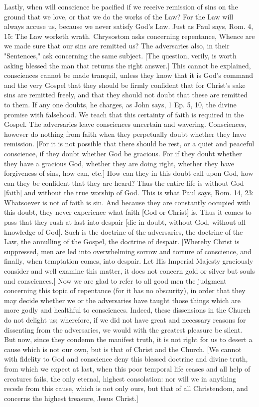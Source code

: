 Lastly, when will conscience be pacified if we receive remission of
sins on the ground that we love, or that we do the works of the Law?
For the Law will always accuse us, because we never satisfy God's Law.
Just as Paul says, Rom. 4, 15: The Law worketh wrath.  Chrysostom
asks concerning repentance, Whence are we made sure that our sins are
remitted us?  The adversaries also, in their "Sentences," ask
concerning the same subject.  [The question, verily, is worth asking
blessed the man that returns the right answer.] This cannot be
explained, consciences cannot be made tranquil, unless they know that
it is God's command and the very Gospel that they should be firmly
confident that for Christ's sake sins are remitted freely, and that
they should not doubt that these are remitted to them.  If any one
doubts, he charges, as John says, 1 Ep. 5, 10, the divine promise
with falsehood.  We teach that this certainty of faith is required in
the Gospel.  The adversaries leave consciences uncertain and wavering.
Consciences, however do nothing from faith when they perpetually
doubt whether they have remission.  [For it is not possible that
there should be rest, or a quiet and peaceful conscience, if they
doubt whether God be gracious.  For if they doubt whether they have a
gracious God, whether they are doing right, whether they have
forgiveness of sins, how can, etc.] How can they in this doubt call
upon God, how can they be confident that they are heard?  Thus the
entire life is without God [faith] and without the true worship of
God.  This is what Paul says, Rom. 14, 23: Whatsoever is not of faith
is sin.  And because they are constantly occupied with this doubt,
they never experience what faith [God or Christ] is.  Thus it comes
to pass that they rush at last into despair [die in doubt, without
God, without all knowledge of God].  Such is the doctrine of the
adversaries, the doctrine of the Law, the annulling of the Gospel,
the doctrine of despair.  [Whereby Christ is suppressed, men are led
into overwhelming sorrow and torture of conscience, and finally, when
temptation comes, into despair.  Let His Imperial Majesty graciously
consider and well examine this matter, it does not concern gold or
silver but souls and consciences.] Now we are glad to refer to all
good men the judgment concerning this topic of repentance (for it has
no obscurity), in order that they may decide whether we or the
adversaries have taught those things which are more godly and
healthful to consciences.  Indeed, these dissensions in the Church do
not delight us; wherefore, if we did not have great and necessary
reasons for dissenting from the adversaries, we would with the
greatest pleasure be silent.  But now, since they condemn the
manifest truth, it is not right for us to desert a cause which is not
our own, but is that of Christ and the Church.  [We cannot with
fidelity to God and conscience deny this blessed doctrine and divine
truth, from which we expect at last, when this poor temporal life
ceases and all help of creatures fails, the only eternal, highest
consolation: nor will we in anything recede from this cause, which is
not only ours, but that of all Christendom, and concerns the highest
treasure, Jesus Christ.]

